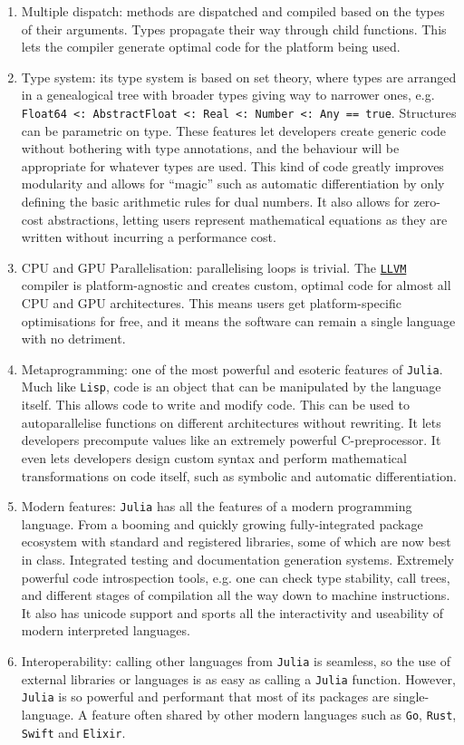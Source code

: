\begin{enumerate}
    \item Multiple dispatch: methods are dispatched and compiled based on the types of their arguments. Types propagate their way through child functions. This lets the compiler generate optimal code for the platform being used.
    \item Type system: its type system is based on set theory, where types are arranged in a genealogical tree with broader types giving way to narrower ones, e.g. \texttt{Float64 <: AbstractFloat <: Real <: Number <: Any == true}. Structures can be parametric on type. These features let developers create generic code without bothering with type annotations, and the behaviour will be appropriate for whatever types are used. This kind of code greatly improves modularity and allows for ``magic'' such as automatic differentiation by only defining the basic arithmetic rules for dual numbers. It also allows for zero-cost abstractions, letting users represent mathematical equations as they are written without incurring a performance cost.
    \item CPU and GPU Parallelisation: parallelising loops is trivial. The \href{https://llvm.org/}{\texttt{LLVM}} compiler is platform-agnostic and creates custom, optimal code for almost all CPU and GPU architectures. This means users get platform-specific optimisations for free, and it means the software can remain a single language with no detriment.
    \item Metaprogramming: one of the most powerful and esoteric features of \texttt{Julia}. Much like \texttt{Lisp}, code is an object that can be manipulated by the language itself. This allows code to write and modify code. This can be used to autoparallelise functions on different architectures without rewriting. It lets developers precompute values like an extremely powerful C-preprocessor. It even lets developers design custom syntax and perform mathematical transformations on code itself, such as symbolic and automatic differentiation.
    \item Modern features: \texttt{Julia} has all the features of a modern programming language. From a booming and quickly growing fully-integrated package ecosystem with standard and registered libraries, some of which are now best in class. Integrated testing and documentation generation systems. Extremely powerful code introspection tools, e.g. one can check type stability, call trees, and different stages of compilation all the way down to machine instructions. It also has unicode support and sports all the interactivity and useability of modern interpreted languages.
    \item Interoperability: calling other languages from \texttt{Julia} is seamless, so the use of external libraries or languages is as easy as calling a \texttt{Julia} function. However, \texttt{Julia} is so powerful and performant that most of its packages are single-language. A feature often shared by other modern languages such as \texttt{Go}, \texttt{Rust}, \texttt{Swift} and \texttt{Elixir}.
\end{enumerate}

